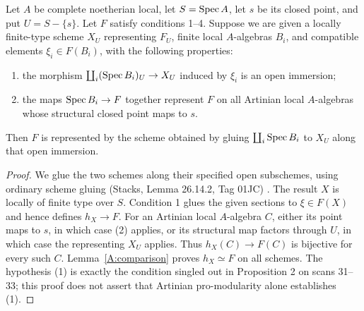 \begin{proposition}\label{A:formal-gluing}
Let $A$ be complete noetherian local, let $S=\operatorname{Spec} A$, let $s$ be
its closed point, and put $U=S-\{s\}$. Let $F$ satisfy conditions
1--4. Suppose we are given a locally finite-type scheme $X_U$
representing $F_U$, finite local $A$-algebras $B_i$, and compatible
elements $\xi_i\in F(B_i)$, with the following properties:
\begin{enumerate}
\item the morphism
$\coprod_i(\operatorname{Spec} B_i)_U\to X_U$ induced by $\xi_i$ is an open
immersion;
\item the maps $\operatorname{Spec} B_i\to F$ together represent $F$ on all
Artinian local $A$-algebras whose structural closed point maps to $s$.
\end{enumerate}
Then $F$ is represented by the scheme obtained by gluing
$\coprod_i\operatorname{Spec} B_i$ to $X_U$ along that open immersion.
\end{proposition}
\begin{proof}
We glue the two schemes along their specified open subschemes, using
ordinary scheme gluing (Stacks, Lemma 26.14.2, Tag 01JC)
\cite{Stacks01JC}. The result $X$ is locally of finite type over $S$.
Condition 1 glues the given sections to $\xi\in F(X)$ and hence
defines $h_X\to F$. For an Artinian local $A$-algebra $C$, either
its point maps to $s$, in which case (2) applies, or its structural
map factors through $U$, in which case the representing $X_U$
applies. Thus $h_X(C)\to F(C)$ is bijective for every such $C$.
Lemma~\ref{A:comparison} proves $h_X\simeq F$ on all schemes.
The hypothesis (1) is exactly the condition singled out in
Proposition 2 on scans 31--33; this proof does not assert that
Artinian pro-modularity alone establishes (1).
\end{proof}

